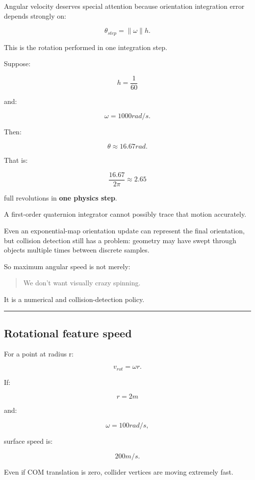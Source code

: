 Angular velocity deserves special attention because orientation integration error depends strongly on:

\[
\boxed{
\theta_{step}
=
\|\omega\|h.
}
\]

This is the rotation performed in one integration step.

Suppose:

\[
h=\frac1{60}
\]

and:

\[
\omega=1000rad/s.
\]

Then:

\[
\theta
\approx16.67rad.
\]

That is:

\[
\frac{16.67}{2\pi}
\approx2.65
\]

full revolutions in \textbf{one physics step}.

A first-order quaternion integrator cannot possibly trace that motion accurately.

Even an exponential-map orientation update can represent the final orientation, but collision detection still has a problem: geometry may have swept through objects multiple times between discrete samples.

So maximum angular speed is not merely:

\begin{quote}
We don't want visually crazy spinning.
\end{quote}

It is a numerical and collision-detection policy.

\begin{center}\rule{0.5\linewidth}{0.5pt}\end{center}

\subsection{Rotational feature speed}\label{06-engine-ii-ch038-rotational-feature-speed}

For a point at radius r:

\[
v_{rot}
=
\omega r.
\]

If:

\[
r=2m
\]

and:

\[
\omega=100rad/s,
\]

surface speed is:

\[
200m/s.
\]

Even if COM translation is zero, collider vertices are moving extremely fast.

